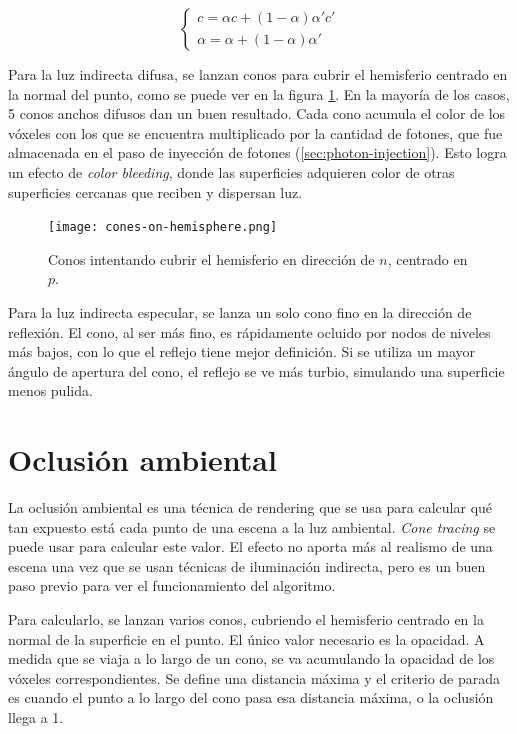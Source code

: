$$
\begin{cases}
    c = \alpha c + (1 - \alpha) \alpha' c' \\
    \alpha = \alpha + (1 - \alpha) \alpha'
\end{cases}
$$

Para la luz indirecta difusa, se lanzan conos para cubrir el hemisferio centrado en la normal del punto, como se puede ver en la figura \ref{fig:cone-hemisphere}.
En la mayoría de los casos, 5 conos anchos difusos dan un buen resultado.
Cada cono acumula el color de los vóxeles con los que se encuentra multiplicado por la cantidad de fotones, que fue almacenada en el paso de inyección de fotones (\ref{sec:photon-injection}).
Esto logra un efecto de \textit{color bleeding}, donde las superficies adquieren color de otras superficies cercanas que reciben y dispersan luz.

\begin{figure}[hb]
    \centering
    \texttt{[image: cones-on-hemisphere.png]}
    \caption{Conos intentando cubrir el hemisferio en dirección de $n$, centrado en $p$.}
    \label{fig:cone-hemisphere}
\end{figure}

Para la luz indirecta especular, se lanza un solo cono fino en la dirección de reflexión.
El cono, al ser más fino, es rápidamente ocluido por nodos de niveles más bajos, con lo que el reflejo tiene mejor definición.
Si se utiliza un mayor ángulo de apertura del cono, el reflejo se ve más turbio, simulando una superficie menos pulida.

\section{Oclusión ambiental}

La oclusión ambiental es una técnica de rendering que se usa para calcular qué tan expuesto está cada punto de una escena a la luz ambiental.
\textit{Cone tracing} se puede usar para calcular este valor.
El efecto no aporta más al realismo de una escena una vez que se usan técnicas de iluminación indirecta, pero es un buen paso previo para ver el funcionamiento del algoritmo.

Para calcularlo, se lanzan varios conos, cubriendo el hemisferio centrado en la normal de la superficie en el punto.
El único valor necesario es la opacidad.
A medida que se viaja a lo largo de un cono, se va acumulando la opacidad de los vóxeles correspondientes.
Se define una distancia máxima y el criterio de parada es cuando el punto a lo largo del cono pasa esa distancia máxima, o la oclusión llega a 1.

